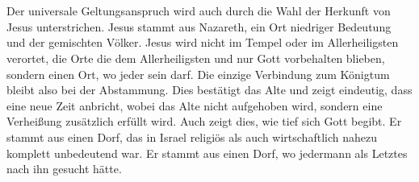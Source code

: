 \\~\\
Der universale Geltungsanspruch wird auch durch die Wahl der Herkunft von Jesus unterstrichen. Jesus stammt aus Nazareth, ein Ort niedriger Bedeutung und der gemischten Völker. Jesus wird nicht im Tempel oder im Allerheiligsten verortet, die Orte die dem Allerheiligsten und nur Gott vorbehalten blieben, sondern einen Ort, wo jeder sein darf. Die einzige Verbindung zum Königtum bleibt also bei der Abstammung. Dies bestätigt das Alte und zeigt eindeutig, dass eine neue Zeit anbricht, wobei das Alte nicht aufgehoben wird, sondern eine Verheißung zusätzlich erfüllt wird. Auch zeigt dies, wie tief sich Gott begibt. Er stammt aus einen Dorf, das in Israel religiös als auch wirtschaftlich nahezu komplett unbedeutend war. Er stammt aus einen Dorf, wo jedermann als Letztes nach ihn gesucht hätte.

